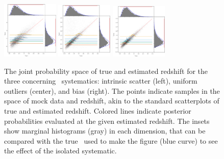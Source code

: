 \begin{figure}
	\begin{center}
		\includegraphics[width=0.24\textwidth]{figures/chippr/scatter_scatplot.png}
		\includegraphics[width=0.24\textwidth]{figures/chippr/outlier_scatplot.png}
		\includegraphics[width=0.24\textwidth]{figures/chippr/bias_scatplot.png}
		\caption{The joint probability space of true and estimated redshift for the three concerning \pz\ systematics: intrinsic scatter (left), uniform outliers (center), and bias (right).
			The points indicate samples in the space of mock data and redshift, akin to the standard scatterplots of true and estimated redshift.
			Colored lines indicate posterior probabilities evaluated at the given estimated redshift.
			The insets show marginal histograms (gray) in each dimension, that can be compared with the true \nz\ used to make the figure (blue curve) to see the effect of the isolated systematic.
		}
	\end{center}
\end{figure}

